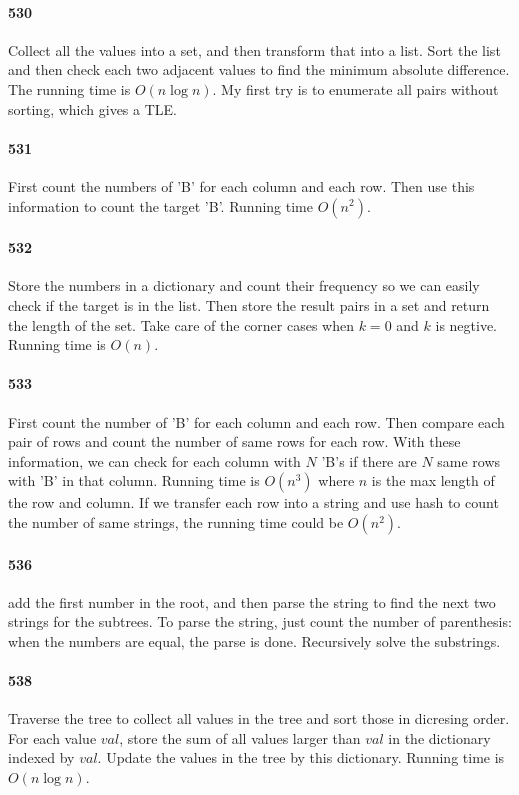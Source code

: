 \documentclass[11pt]{article}
\begin{document}
\paragraph{530}
Collect all the values into a set, and then transform that into a list.
Sort the list and then check each two adjacent values to find the minimum absolute difference. 
The running time is $O(n \log n)$.
My first try is to enumerate all pairs without sorting, which gives a TLE.

\paragraph{531}
First count the numbers of 'B' for each column and each row. Then use this information to count the target 'B'.
Running time $O(n^2)$.


\paragraph{532}
Store the numbers in a dictionary and count their frequency so we can easily check if the target is in the list. 
Then store the result pairs in a set and return the length of the set. Take care of the corner cases when $k = 0$ 
and $k$ is negtive.
Running time is $O(n)$.


\paragraph{533}
First count the number of 'B' for each column and each row. Then compare each pair of rows and count the number of same rows
for each row. With these information, we can check for each column with $N$ 'B's if there are $N$ same rows with 'B' in that 
column. 
Running time is $O(n^3)$ where $n$ is the max length of the row and column. If we transfer each row into a string and use hash to count the number of same strings, the running time could be $O(n^2)$.

\paragraph{536}
add the first number in the root, and then parse the string to find the next two strings for the subtrees. To parse the 
string, just count the number of parenthesis: when the numbers are equal, the parse is done. Recursively solve the substrings.

\paragraph{538}
Traverse the tree to collect all values in the tree and sort those in dicresing order. For each value $val$, store the sum of 
all values larger than $val$ in the dictionary indexed by $val$. Update the values in the tree by this dictionary.
Running time is $O(n \log n)$.
\end{document}
